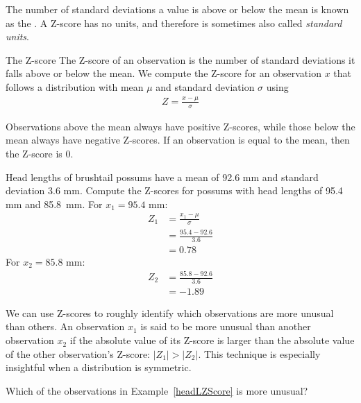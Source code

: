 The number of standard deviations a value is above or below the mean is known as the .  A Z-score has no units, and therefore is sometimes also called \emph{standard units}.

\begin{onebox}{The Z-score}
  The Z-score of an observation is the number of standard
  deviations it falls above or below the mean.
  We compute the Z-score for an observation $x$ that follows
  a distribution with mean $\mu$ and standard deviation
  $\sigma$ using
  \begin{align*}
  Z = \frac{x - \mu}{\sigma}
  \end{align*}
\end{onebox}

Observations above the mean always have positive Z-scores,
while those below the mean always have negative Z-scores.
If an observation is equal to the mean, then the Z-score is $0$.

\begin{examplewrap}
\begin{nexample} 
{Head lengths of brushtail possums have a mean of 92.6 mm and standard deviation 3.6 mm.
Compute the Z-scores for possums with head lengths of 95.4 mm
and 85.8~mm.}
\label{headLZScore}%
For $x_1=95.4$ mm:
\begin{align*}
    Z_1&= \frac{x_1 - \mu}{\sigma}\\
      &= \frac{95.4 - 92.6}{3.6}\\
      &= 0.78
\end{align*}
    For $x_2=85.8$ mm:
\begin{align*}
    Z_2 &= \frac{85.8 - 92.6}{3.6} \\
&= -1.89
\end{align*}
\end{nexample}
\end{examplewrap}


We can use Z-scores to roughly identify which observations
are more unusual than others.
An observation $x_1$ is said to be more unusual than another
observation $x_2$ if the absolute value of its Z-score is larger
than the absolute value of the other observation's Z-score:
$|Z_1| > |Z_2|$.
This technique is especially insightful when a distribution
is symmetric.

\begin{exercisewrap}
\begin{nexercise}
Which of the observations in Example~\ref{headLZScore}
is more unusual?\footnotemark
\end{nexercise}
\end{exercisewrap}

